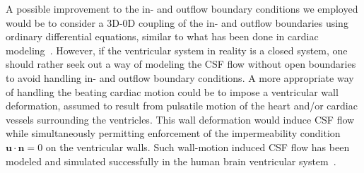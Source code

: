 \documentclass[fleqn]{wlscirep}
\newcommand{\nn}{\mathbf{n}}
\newcommand{\uu}{\mathbf{u}}
\begin{document}
A possible improvement to the in- and outflow boundary conditions we employed would be to consider a 3D-0D coupling of the in- and outflow boundaries using ordinary differential equations, similar to what has been done in cardiac modeling~\cite{Brown2024AMechanics, Augustin2021ACirculation}. However, if the ventricular system in reality is a closed system, one should rather seek out a way of modeling the CSF flow without open boundaries to avoid handling in- and outflow boundary conditions. A more appropriate way of handling the beating cardiac motion could be to impose a ventricular wall deformation, assumed to result from pulsatile motion of the heart and/or cardiac vessels surrounding the ventricles. This wall deformation would induce CSF flow while simultaneously permitting enforcement of the impermeability condition $\uu\cdot\nn=0$ on the ventricular walls. Such wall-motion induced CSF flow has been modeled and simulated successfully in the human brain ventricular system~\cite{Causemann2022HumanFramework, Kurtcuoglu2005ComputationalSystem, Kurtcuoglu2007ComputationalSylvius, Linninger2005PulsatileBrain}.
\end{document}
